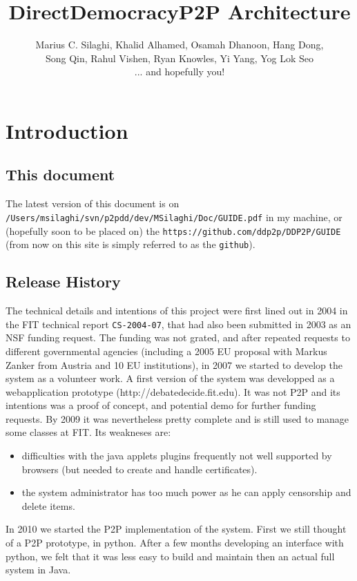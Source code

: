 \documentclass{book}
\title{DirectDemocracyP2P Architecture}
\author{Marius C. Silaghi, Khalid Alhamed, Osamah Dhanoon, Hang Dong,\\
 Song Qin, Rahul Vishen, Ryan Knowles, Yi Yang, Yog Lok Seo \\
... and hopefully you!}
\begin{document}
\maketitle
\chapter{Introduction}
\section{This document}
The latest version of this document is on {\tt /Users/msilaghi/svn/p2pdd/dev/MSilaghi/Doc/GUIDE.pdf} in my
machine, or (hopefully soon to be placed on) the {\tt https://github.com/ddp2p/DDP2P/GUIDE} (from now on this site is simply referred to as the {\tt github}).

\section{Release History}

The technical details and intentions of this project were first lined out in 2004 in the FIT technical report {\tt CS-2004-07}, that had also been  submitted in 2003 as an NSF funding request.
The funding was not grated, and after repeated requests to different governmental agencies (including a 2005 EU proposal with Markus Zanker from Austria and 10 EU institutions), 
in 2007 we started to develop the system as a volunteer work.
A first version of the system was developped as a webapplication prototype (http://debatedecide.fit.edu). It was not P2P and its intentions was a proof of concept,
and potential demo for further funding requests. By 2009 it was nevertheless pretty complete and is still used to manage some classes at FIT. Its weakneses are:
\begin{itemize}
\item
difficulties with the java applets plugins frequently not well supported by browsers (but needed to create and handle certificates).
\item
the system administrator has too much power as he can apply censorship and delete items.
\end{itemize}

In 2010 we started the P2P implementation of the system. First we still thought of a P2P prototype, in python. After a few months developing an interface with python,
we felt that it was less easy to build and maintain then an actual full system in Java.
\end{document}
